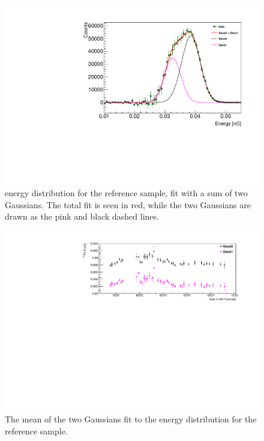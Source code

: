 \begin{figure}[h]
	\centering
	\includegraphics[width=0.6\linewidth]{tex/6-ac227-images/BNL/PoEnFit_TimeBin23_S2}
	\caption[\Po energy distribution for reference sample with two Gaussian fit]{\Po energy distribution for the reference sample, fit with a sum of two Gaussians. The total fit is seen in red, while the two Gaussians are drawn as the pink and black dashed lines.}
	\label{fig:poenfittimebin23s2}
\end{figure}

\begin{figure}[H]
	\centering
	\includegraphics[width=0.9\linewidth]{tex/6-ac227-images/BNL/PoEnMeanVsTime_S2}
	\caption[\Po mean versus time for the reference sample]{The mean of the two Gaussians fit to the \Po energy distribution for the reference sample.}
	\label{fig:poenmeanvstimes2}
\end{figure}

